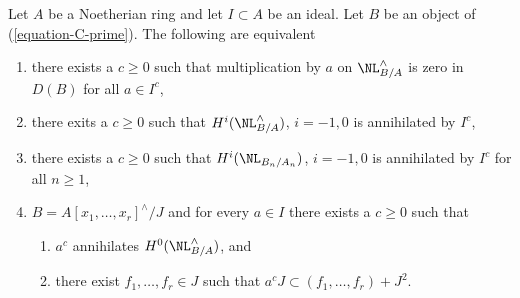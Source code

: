 \begin{lemma}
\label{lemma-equivalent-with-artin}
Let $A$ be a Noetherian ring and let $I \subset A$ be an ideal.
Let $B$ be an object of (\ref{equation-C-prime}). The following are equivalent
\begin{enumerate}
\item
\label{item-zero-on-NL}
there exists a $c \geq 0$ such that multiplication by $a$
on $\NL^\wedge_{B/A}$ is zero in $D(B)$ for all $a \in I^c$,
\item
\label{item-zero-on-cohomology-NL}
there exits a $c \geq 0$ such that $H^i(\NL^\wedge_{B/A})$, $i = -1, 0$ is
annihilated by $I^c$,
\item
\label{item-zero-on-cohomology-NL-truncations}
there exists a $c \geq 0$ such that $H^i(\NL_{B_n/A_n})$, $i = -1, 0$ is
annihilated by $I^c$ for all $n \geq 1$,
\item
\label{item-condition-artin}
$B = A[x_1, \ldots, x_r]^\wedge/J$ and
for every $a \in I$ there exists a $c \geq 0$ such that
\begin{enumerate}
\item $a^c$ annihilates $H^0(\NL^\wedge_{B/A})$, and
\item there exist $f_1, \ldots, f_r \in J$ such that
$a^c J \subset (f_1, \ldots, f_r) + J^2$.
\end{enumerate}
\end{enumerate}
\end{lemma}

